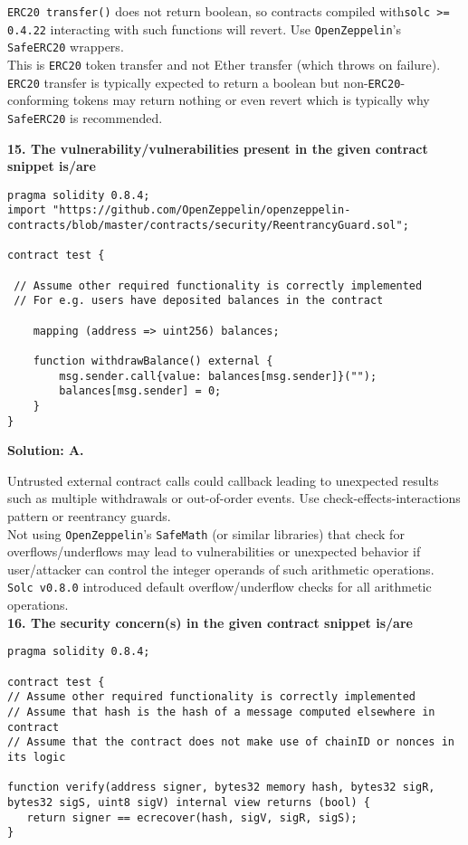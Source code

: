 \verb|ERC20 transfer()| does not return boolean, so contracts compiled with\linebreak\verb|solc >= 0.4.22| interacting with such functions will revert.
Use \verb|OpenZeppelin|'s \verb|SafeERC20| wrappers.\\

This is \verb|ERC20| token transfer and not Ether transfer (which throws on failure).
\verb|ERC20| transfer is typically expected to return a boolean but non-\verb|ERC20|-conforming tokens may return nothing or even revert which is typically why \verb|SafeERC20| is recommended.

\textbf{15. The vulnerability/vulnerabilities present in the given contract snippet is/are}\label{sec:exam4_q15}\\

\begin{lstlisting}[language=Solidity, style=solStyle]
pragma solidity 0.8.4;
import "https://github.com/OpenZeppelin/openzeppelin-contracts/blob/master/contracts/security/ReentrancyGuard.sol";

contract test {

 // Assume other required functionality is correctly implemented
 // For e.g. users have deposited balances in the contract

    mapping (address => uint256) balances;

    function withdrawBalance() external {
        msg.sender.call{value: balances[msg.sender]}("");
        balances[msg.sender] = 0;
    }
}
\end{lstlisting}

\textbf{Solution: A.}

Untrusted external contract calls could callback leading to unexpected results such as multiple withdrawals or out-of-order events.
Use check-effects-interactions pattern or reentrancy guards.\\

Not using \verb|OpenZeppelin|'s \verb|SafeMath| (or similar libraries) that check for overflows/underflows may lead to vulnerabilities or unexpected behavior if user/attacker can control the integer operands of such arithmetic operations.
\verb|Solc v0.8.0| introduced default overflow/underflow checks for all arithmetic operations.\\

\textbf{16. The security concern(s) in the given contract snippet is/are}\label{sec:exam4_q16}\\

\begin{lstlisting}[language=Solidity, style=solStyle]
pragma solidity 0.8.4;

contract test {
// Assume other required functionality is correctly implemented
// Assume that hash is the hash of a message computed elsewhere in contract
// Assume that the contract does not make use of chainID or nonces in its logic

function verify(address signer, bytes32 memory hash, bytes32 sigR, bytes32 sigS, uint8 sigV) internal view returns (bool) {
   return signer == ecrecover(hash, sigV, sigR, sigS);
}
\end{lstlisting}

